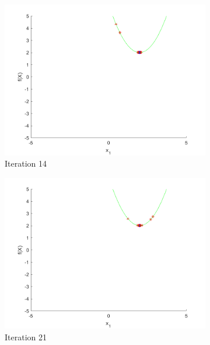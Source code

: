 \begin{figure}
\begin{subfigure}[b]{0.4\textwidth}
   \includegraphics[width=\textwidth]{img/smpl/circshft/loa-iter-14}
   \caption{Iteration 14}
   \label{fig:s3-iter-2}
 \end{subfigure}
 \begin{subfigure}[b]{0.4\textwidth}
   \includegraphics[width=\textwidth]{img/smpl/circshft/loa-iter-21}
   \caption{Iteration 21}
   \label{fig:s3-iter-3}
 \end{subfigure}
 \begin{subfigure}[b]{0.4\textwidth}

\end{subfigure}
\end{figure}
